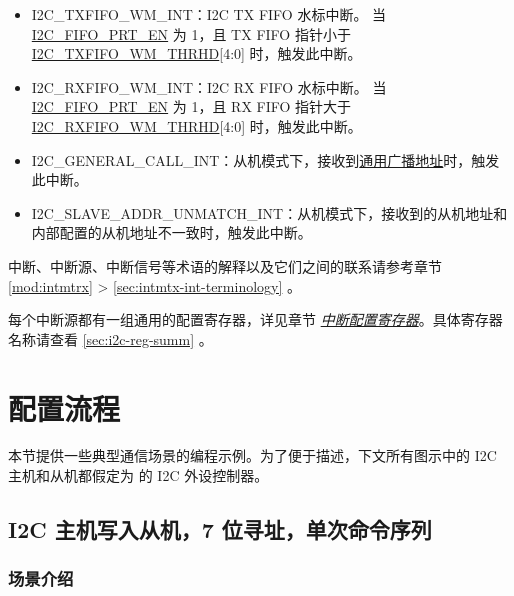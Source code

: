 \documentclass[main\_\_CN.tex]{subfiles}
\begin{document}
\begin{itemize}
\item \label{int:i2c-txfifo-wm}I2C\_TXFIFO\_WM\_INT：I2C TX FIFO 水标中断。 当\hyperref[fielddesc:I2CFIFOPRTEN]{I2C\_FIFO\_PRT\_EN} 为 1，且 TX FIFO 指针小于\\\hyperref[fielddesc:I2CTXFIFOWMTHRHD]{I2C\_TXFIFO\_WM\_THRHD}[4:0] 时，触发此中断。
\item \label{int:i2c-rxfifo-wm}I2C\_RXFIFO\_WM\_INT：I2C RX FIFO 水标中断。 当\hyperref[fielddesc:I2CFIFOPRTEN]{I2C\_FIFO\_PRT\_EN} 为 1，且 RX FIFO 指针大于\\\hyperref[fielddesc:I2CRXFIFOWMTHRHD]{I2C\_RXFIFO\_WM\_THRHD}[4:0] 时，触发此中断。
\item \label{int:i2c-general-call}I2C\_GENERAL\_CALL\_INT：从机模式下，接收到\href{https://www.csd.uoc.gr/~hy428/reading/i2c_spec.pdf#page=16}{通用广播地址}时，触发此中断。
\item I2C\_SLAVE\_ADDR\_UNMATCH\_INT：从机模式下，接收到的从机地址和内部配置的从机地址不一致时，触发此中断。
\end{itemize}

\begin{tiplisting}
中断、中断源、中断信号等术语的解释以及它们之间的联系请参考章节 \ref{mod:intmtrx} \textit{} > \ref{sec:intmtx-int-terminology} \textit{}。
\end{tiplisting}

每个中断源都有一组通用的配置寄存器，详见章节 \hyperref[interrupt-config-registers]{\textit{中断配置寄存器}}。具体寄存器名称请查看 \ref{sec:i2c-reg-summ} \textit{}。

\section{配置流程}
\label{subsec:i2c-prom-guide}

本节提供一些典型通信场景的编程示例。为了便于描述，下文所有图示中的 I2C 主机和从机都假定为 \chipname{} 的 I2C 外设控制器。

\subsection{I2C 主机写入从机，7 位寻址，单次命令序列}
\label{subsec:i2c-mws7}

\subsubsection{场景介绍}
\end{document}
